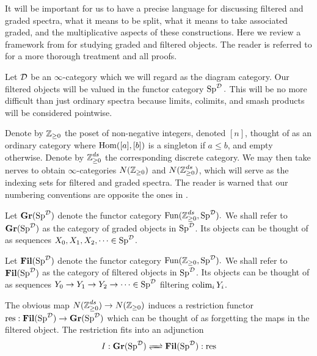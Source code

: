 
It will be important for us to have a precise language for discussing filtered and graded spectra, what it means to be split, what it means to take associated graded, and the multiplicative aspects of these constructions. Here we review a framework from \cite{LurieRot} for studying graded and filtered objects.  The reader is referred to \cite{LurieRot} for a more thorough treatment and all proofs.  

Let $\operatorname{\mathcal{D}}$ be an $\infty$-category which we will regard as the diagram category.  Our filtered objects will be valued in the functor category $\operatorname{\text{Sp}}^{\operatorname{\mathcal{D}}}.$  This will be no more difficult than just ordinary spectra because limits, colimits, and smash products will be considered pointwise.  

Denote by $\operatorname{\mathbb{Z}}_{\geq 0}$ the poset of non-negative integers, denoted $[n]$, thought of as an ordinary category where $\operatorname{\text{Hom}}([a],[b])$ is a singleton if $a\leq b$, and empty otherwise.  Denote by $\operatorname{\mathbb{Z}}_{\geq 0}^{ds}$ the corresponding discrete category.  We may then take nerves to obtain $\infty$-categories $N(\operatorname{\mathbb{Z}}_{\geq 0})$ and $N(\operatorname{\mathbb{Z}}_{\geq 0}^{ds})$, which will serve as the indexing sets for filtered and graded spectra.  The reader is warned that our numbering conventions are opposite the ones in \cite{LurieRot}.

\begin{dfn} 
Let $\operatorname{\textbf{Gr}}(\operatorname{\text{Sp}}^{\operatorname{\mathcal{D}}})$ denote the functor category $\operatorname{\text{Fun}}(\operatorname{\mathbb{Z}}_{\geq 0}^{ds}, \operatorname{\text{Sp}}^{\operatorname{\mathcal{D}}}).$  We shall refer to $\operatorname{\textbf{Gr}}(\operatorname{\text{Sp}}^{\operatorname{\mathcal{D}}})$ as the category of graded objects in $\operatorname{\text{Sp}}^{\operatorname{\mathcal{D}}}$.  Its objects can be thought of as sequences $X_0, X_1,X_2,\cdots \in \operatorname{\text{Sp}}^{\operatorname{\mathcal{D}}}$.
\end{dfn}

\begin{dfn} 
Let $\operatorname{\textbf{Fil}}(\operatorname{\text{Sp}}^{\operatorname{\mathcal{D}}})$ denote the functor category $\operatorname{\text{Fun}}(\operatorname{\mathbb{Z}}_{\geq 0}, \operatorname{\text{Sp}}^{\operatorname{\mathcal{D}}}).$  We shall refer to $\operatorname{\textbf{Fil}}(\operatorname{\text{Sp}}^{\operatorname{\mathcal{D}}})$ as the category of filtered objects in $\operatorname{\text{Sp}}^{\operatorname{\mathcal{D}}}$.  Its objects can be thought of as sequences $Y_0\to Y_1\to Y_2 \to \cdots \in \operatorname{\text{Sp}}^{\operatorname{\mathcal{D}}}$ filtering $\operatorname*{\text{colim}}_i Y_i$.  
\end{dfn}


The obvious map $N(\operatorname{\mathbb{Z}}_{\geq 0}^{ds}) \to N(\operatorname{\mathbb{Z}}_{\geq 0})$ induces a restriction functor $\text{res}: \operatorname{\textbf{Fil}}(\operatorname{\text{Sp}}^{\operatorname{\mathcal{D}}}) \to \operatorname{\textbf{Gr}}(\operatorname{\text{Sp}}^{\operatorname{\mathcal{D}}})$ which can be thought of as forgetting the maps in the filtered object.  The restriction fits into an adjunction  
$$I:\Gr(\Sp^{\D}) \xrightleftharpoons{\quad} \Fil(\Sp^{\D}) : \text{res}$$


